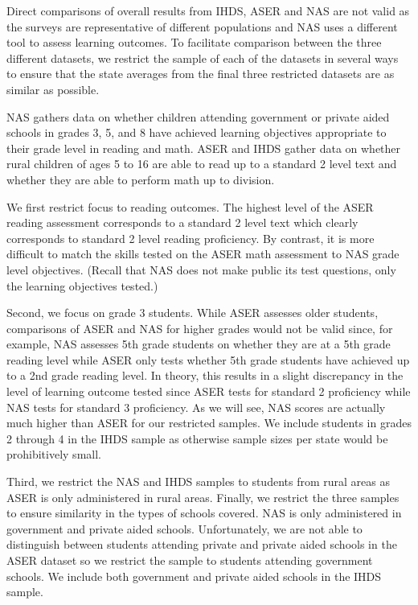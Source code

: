 \documentclass[
  11pt,
]{article}
\begin{document}
Direct comparisons of overall results from IHDS, ASER and NAS are not valid as the surveys are representative of different populations and NAS uses a different tool to assess learning outcomes. To facilitate comparison between the three different datasets, we restrict the sample of each of the datasets in several ways to ensure that the state averages from the final three restricted datasets are as similar as possible.

NAS gathers data on whether children attending government or private aided schools in grades 3, 5, and 8 have achieved learning objectives appropriate to their grade level in reading and math. ASER and IHDS gather data on whether rural children of ages 5 to 16 are able to read up to a standard 2 level text and whether they are able to perform math up to division.

We first restrict focus to reading outcomes. The highest level of the ASER reading assessment corresponds to a standard 2 level text which clearly corresponds to standard 2 level reading proficiency. By contrast, it is more difficult to match the skills tested on the ASER math assessment to NAS grade level objectives. (Recall that NAS does not make public its test questions, only the learning objectives tested.)

Second, we focus on grade 3 students. While ASER assesses older students, comparisons of ASER and NAS for higher grades would not be valid since, for example, NAS assesses 5th grade students on whether they are at a 5th grade reading level while ASER only tests whether 5th grade students have achieved up to a 2nd grade reading level. In theory, this results in a slight discrepancy in the level of learning outcome tested since ASER tests for standard 2 proficiency while NAS tests for standard 3 proficiency. As we will see, NAS scores are actually much higher than ASER for our restricted samples. We include students in grades 2 through 4 in the IHDS sample as otherwise sample sizes per state would be prohibitively small.

Third, we restrict the NAS and IHDS samples to students from rural areas as ASER is only administered in rural areas. Finally, we restrict the three samples to ensure similarity in the types of schools covered. NAS is only administered in government and private aided schools. Unfortunately, we are not able to distinguish between students attending private and private aided schools in the ASER dataset so we restrict the sample to students attending government schools. We include both government and private aided schools in the IHDS sample.
\end{document}
